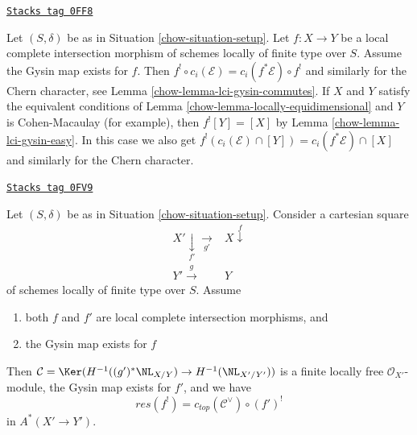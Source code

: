 \begin{remark}
\label{chow-remark-gysin-chern-classes}
\href{https://stacks.math.columbia.edu/tag/0FF8}{\texttt{Stacks tag 0FF8}}

Let $(S, \delta)$ be as in Situation \ref{chow-situation-setup}.
Let $f : X \to Y$ be a local complete intersection morphism
of schemes locally of finite type over $S$. Assume the Gysin
map exists for $f$. Then
$f^! \circ c_i(\mathcal{E}) = c_i(f^*\mathcal{E}) \circ f^!$
and similarly for the Chern character, see
Lemma \ref{chow-lemma-lci-gysin-commutes}.
If $X$ and $Y$ satisfy the equivalent conditions of
Lemma \ref{chow-lemma-locally-equidimensional} and $Y$ is Cohen-Macaulay
(for example), then $f^![Y] = [X]$ by Lemma \ref{chow-lemma-lci-gysin-easy}.
In this case we also get
$f^!(c_i(\mathcal{E}) \cap [Y]) = c_i(f^*\mathcal{E}) \cap [X]$
and similarly for the Chern character.
\end{remark}

\begin{lemma}
\label{chow-lemma-compare-gysin-base-change}
\href{https://stacks.math.columbia.edu/tag/0FV9}{\texttt{Stacks tag 0FV9}}

Let $(S, \delta)$ be as in Situation \ref{chow-situation-setup}.
Consider a cartesian square
$$
\begin{array}{cc}X' \underset{f'}{\downarrow}\underset{g'}{\longrightarrow} & X \overset{f}{\downarrow} \\ Y' \overset{g}{\longrightarrow} & Y\end{array}
$$
of schemes locally of finite type over $S$. Assume
\begin{enumerate}
\item both $f$ and $f'$ are local complete intersection morphisms, and
\item the Gysin map exists for $f$
\end{enumerate}
Then $\mathcal{C} = \Ker(H^{-1}((g')^*\NL_{X/Y}) \to H^{-1}(\NL_{X'/Y'}))$
is a finite locally free $\mathcal{O}_{X'}$-module, the Gysin map
exists for $f'$, and we have
$$
res(f^!) = c_{top}(\mathcal{C}^\vee) \circ (f')^!
$$
in $A^*(X' \to Y')$.
\end{lemma}

